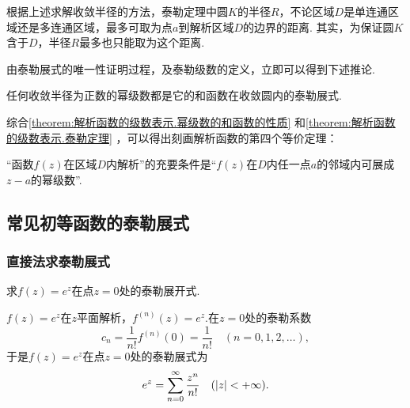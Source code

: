 根据上述求解收敛半径的方法，泰勒定理中圆\(K\)的半径\(R\)，不论区域\(D\)是单连通区域还是多连通区域，最多可取为点\(a\)到解析区域\(D\)的边界的距离.
其实，为保证圆\(K\)含于\(D\)，半径\(R\)最多也只能取为这个距离.

由泰勒展式的唯一性证明过程，及泰勒级数的定义，立即可以得到下述推论.
\begin{corollary}
任何收敛半径为正数的幂级数都是它的和函数在收敛圆内的泰勒展式.
\end{corollary}

综合\cref{theorem:解析函数的级数表示.幂级数的和函数的性质} 和\cref{theorem:解析函数的级数表示.泰勒定理} ，可以得出刻画解析函数的第四个等价定理：
\begin{theorem}
“函数\(f(z)\)在区域\(D\)内解析”的充要条件是“\(f(z)\)在\(D\)内任一点\(a\)的邻域内可展成\(z-a\)的幂级数”.
\end{theorem}

\subsection{常见初等函数的泰勒展式}
\subsubsection{直接法求泰勒展式}
\begin{example}
求\(f(z) = e^z\)在点\(z = 0\)处的泰勒展开式.
\begin{solution}
\(f(z) = e^z\)在\(z\)平面解析，\(f^{(n)}(z) = e^z\).在\(z = 0\)处的泰勒系数\[
c_n = \frac{1}{n!} f^{(n)}(0) = \frac{1}{n!}
\quad(n=0,1,2,\dotsc),
\]于是\(f(z) = e^z\)在点\(z = 0\)处的泰勒展式为\begin{equation}\label{equation:解析函数的级数表示.指数函数的泰勒展式}
e^z = \sum\limits_{n=0}^{\infty} \frac{z^n}{n!}
\quad(\abs{z} < +\infty).
\end{equation}
\end{solution}
\end{example}

